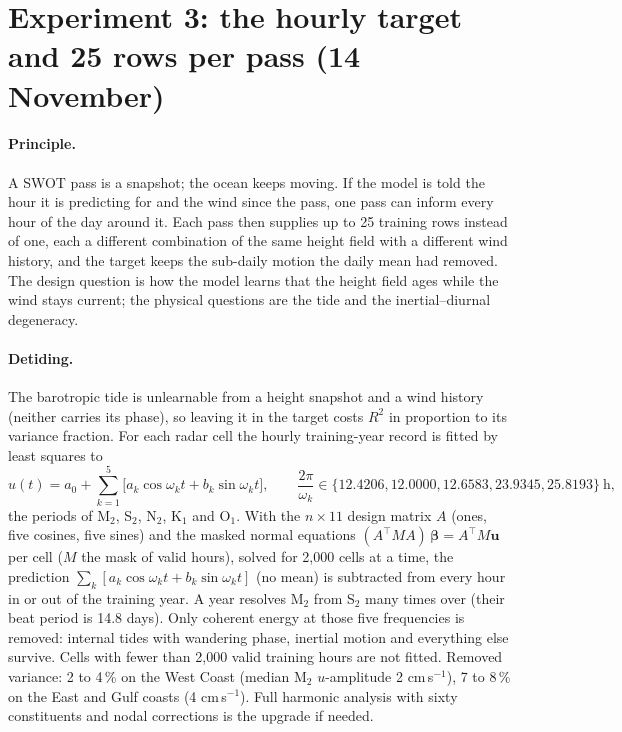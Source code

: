 \documentclass[11pt]{article}
\newcommand{\R}{R^2}
\begin{document}
\section{Experiment 3: the hourly target and 25 rows per pass (14 November)}\label{sec:hourly}

\paragraph{Principle.} A SWOT pass is a snapshot; the ocean keeps moving. If the model is told the hour it is predicting for and the wind since the pass, one pass can inform every hour of the day around it. Each pass then supplies up to 25 training rows instead of one, each a different combination of the same height field with a different wind history, and the target keeps the sub-daily motion the daily mean had removed. The design question is how the model learns that the height field ages while the wind stays current; the physical questions are the tide and the inertial--diurnal degeneracy.

\paragraph{Detiding.} The barotropic tide is unlearnable from a height snapshot and a wind history (neither carries its phase), so leaving it in the target costs $\R$ in proportion to its variance fraction. For each radar cell the hourly training-year record is fitted by least squares to
\begin{equation}
u(t) = a_0 + \sum_{k=1}^{5}\big[a_k\cos\omega_k t + b_k\sin\omega_k t\big],\qquad
\frac{2\pi}{\omega_k} \in \{12.4206, 12.0000, 12.6583, 23.9345, 25.8193\}\ \text{h},
\label{eq:detide}
\end{equation}
the periods of M$_2$, S$_2$, N$_2$, K$_1$ and O$_1$. With the $n\times11$ design matrix $A$ (ones, five cosines, five sines) and the masked normal equations $(A^\top M A)\,\boldsymbol\beta = A^\top M \mathbf{u}$ per cell ($M$ the mask of valid hours), solved for 2,000 cells at a time, the prediction $\sum_k [a_k\cos\omega_k t + b_k\sin\omega_k t]$ (no mean) is subtracted from every hour in or out of the training year. A year resolves M$_2$ from S$_2$ many times over (their beat period is 14.8 days). Only coherent energy at those five frequencies is removed: internal tides with wandering phase, inertial motion and everything else survive. Cells with fewer than 2,000 valid training hours are not fitted. Removed variance: 2 to 4\,\% on the West Coast (median M$_2$ $u$-amplitude 2 cm\,s$^{-1}$), 7 to 8\,\% on the East and Gulf coasts (4 cm\,s$^{-1}$). Full harmonic analysis with sixty constituents and nodal corrections \citep{pawlowicz2002ttide} is the upgrade if needed.
\end{document}

